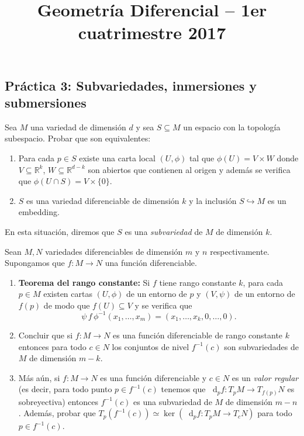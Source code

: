\documentclass[12pt, a4paper]{amsart}
\theoremstyle{definition}
\newcommand{\RR}{\mathbb{R}}      %
\newcommand*\diff{\mathop{}\!\mathrm{d}}
\begin{document}
\title{Geometría Diferencial -- 1er cuatrimestre 2017}
\author{}
\date{}
\nocite{*}
\maketitle
\begin{center}
\section*{Práctica 3: Subvariedades, inmersiones y submersiones}
\end{center}

\begin{question}
Sea $M$ una variedad de dimensión $d$ y sea $S\subseteq M$ un espacio con la topología subespacio. Probar que son equivalentes:
\begin{enumerate}[label=\textbf{\alph*.}]
\item Para cada $p\in S$ existe una carta local $(U,\phi)$ tal que $\phi(U)=V\times W$ donde $V\subseteq\RR^k$, $W\subseteq\RR^{d-k}$ son abiertos que contienen al origen y además se verifica que $\phi(U\cap S) = V\times\{0\}$.
\item $S$ es una variedad diferenciable de dimensión $k$ y la inclusión $S\hookrightarrow M$ es un embedding.
\end{enumerate}
En esta situación, diremos que $S$ es una \textit{subvariedad} de $M$ de dimensión $k$.
\end{question}

\begin{question}Sean $M,N$ variedades diferenciables de dimensión $m$ y $n$ respectivamente. Supongamos que $f:M\to N$ una función diferenciable.
\begin{enumerate}[label=\textbf{\alph*.}]
\item \textbf{Teorema del rango constante:}  Si $f$ tiene rango constante $k$, para cada $p\in M$ existen cartas $(U,\phi)$ de un entorno de $p$ y $(V,\psi)$ de un entorno de $f(p)$ de modo que $f(U)\subseteq V$ y se verifica que $$\psi\, f\, \phi^{-1} (x_1,\ldots,x_m) = (x_1,\ldots,x_k,0,\ldots,0).$$

\item Concluir que si $f:M\to N$ es una función diferenciable de rango constante $k$ entonces para todo $c\in N$ los conjuntos de nivel $f^{-1}(c)$ son subvariedades de $M$ de dimensión $m-k$.

\item Más aún, si $f:M\to N$ es una función diferenciable y $c\in N$ es un \textit{valor regular} (es decir, para todo punto $p\in f^{-1}(c)$ tenemos que $\diff_p f:T_pM\to T_{f(p)}N$ es sobreyectiva) entonces $f^{-1}(c)$ es una subvariedad de $M$ de dimensión $m-n$. Además, probar que $T_p(f^{-1}(c)) \simeq \ker(\diff_p f:T_pM\to T_cN)$ para todo $p\in f^{-1}(c)$.
\end{enumerate}
\end{question}
\end{document}
